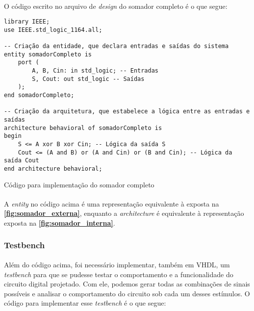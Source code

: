 \documentclass[a4paper,12pt]{article}
\newenvironment{code}{\captionsetup{type=listing}}{}
\begin{document}
\paragraph{}
O código escrito no arquivo de \textit{design} do somador completo é o que segue:

\begin{code}
\begin{verbatim}
library IEEE;
use IEEE.std_logic_1164.all;

-- Criação da entidade, que declara entradas e saídas do sistema
entity somadorCompleto is
    port (
        A, B, Cin: in std_logic; -- Entradas
        S, Cout: out std_logic -- Saídas
    );
end somadorCompleto;

-- Criação da arquitetura, que estabelece a lógica entre as entradas e saídas
architecture behavioral of somadorCompleto is
begin
    S <= A xor B xor Cin; -- Lógica da saída S
    Cout <= (A and B) or (A and Cin) or (B and Cin); -- Lógica da saída Cout
end architecture behavioral;
\end{verbatim}
\caption{Código para implementação do somador completo}
\end{code}

\paragraph{}
A \textit{entity} no código acima é uma representação equivalente à exposta na \textbf{\autoref{fig:somador_externa}}, enquanto a \textit{architecture} é equivalente à representação exposta na \textbf{\autoref{fig:somador_interna}}.

\subsubsection{Testbench}
\paragraph{}
Além do código acima, foi necessário implementar, também em VHDL, um \textit{testbench} para que se pudesse testar o comportamento e a funcionalidade do circuito digital projetado. Com ele, podemos gerar todas as combinações de sinais possíveis e analisar o comportamento do circuito sob cada um desses estímulos. O código para implementar esse \textit{testbench} é o que segue:
\end{document}
